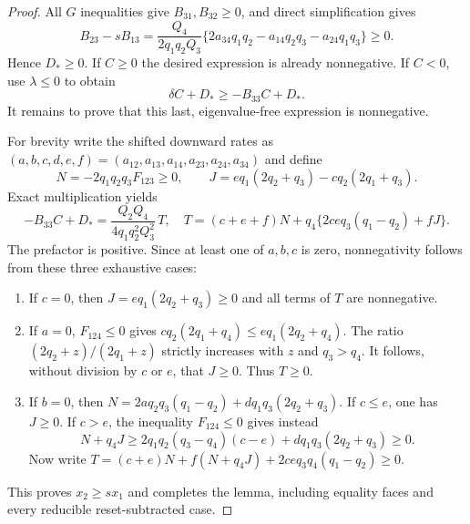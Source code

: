 \begin{proof}
All $G$ inequalities give $B_{31},B_{32}\geq0$, and direct simplification gives
\[
B_{23}-sB_{13}
=\frac{Q_4}{2q_1q_2Q_3}
\{2a_{34}q_1q_2-a_{14}q_2q_3-a_{24}q_1q_3\}\geq0.
\]
Hence $D_*\geq0$. If $C\geq0$ the desired expression is already
nonnegative. If $C<0$, use $\lambda\leq0$ to obtain
\[
\delta C+D_*\geq-B_{33}C+D_*.
\]
It remains to prove that this last, eigenvalue-free expression is nonnegative.

For brevity write the shifted downward rates as
$(a,b,c,d,e,f)=(a_{12},a_{13},a_{14},a_{23},a_{24},a_{34})$ and define
\[
N=-2q_1q_2q_3F_{123}\geq0,\qquad
J=e q_1(2q_2+q_3)-c q_2(2q_1+q_3).
\]
Exact multiplication yields
\[
-B_{33}C+D_*=
\frac{Q_2Q_4}{4q_1q_2^2Q_3^2}\,T,
\quad
T=(c+e+f)N+q_4\{2ceq_3(q_1-q_2)+fJ\}.
\]
The prefactor is positive. Since at least one of $a,b,c$ is zero,
nonnegativity follows from these three exhaustive cases:
\begin{enumerate}
\item If $c=0$, then $J=e q_1(2q_2+q_3)\geq0$ and all terms of $T$
are nonnegative.
\item If $a=0$, $F_{124}\leq0$ gives
$c q_2(2q_1+q_4)\leq e q_1(2q_2+q_4)$.
The ratio $(2q_2+z)/(2q_1+z)$ strictly increases with $z$ and
$q_3>q_4$. It follows, without division by $c$ or $e$, that $J\geq0$.
Thus $T\geq0$.
\item If $b=0$, then
$N=2a q_2q_3(q_1-q_2)+d q_1q_3(2q_2+q_3)$.
If $c\leq e$, one has $J\geq0$. If $c>e$, the inequality
$F_{124}\leq0$ gives instead
\[
N+q_4J\geq
2q_1q_2(q_3-q_4)(c-e)+d q_1q_3(2q_2+q_3)\geq0.
\]
Now write
$T=(c+e)N+f(N+q_4J)+2ceq_3q_4(q_1-q_2)\geq0$.
\end{enumerate}
This proves $x_2\geq sx_1$ and completes the lemma, including equality
faces and every reducible reset-subtracted case.
\end{proof}


